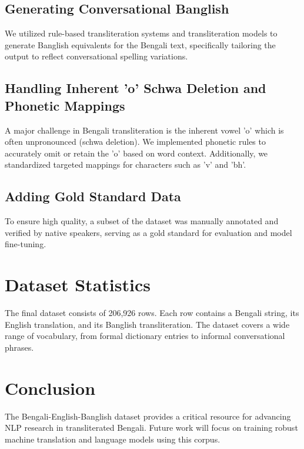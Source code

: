 \documentclass[conference]{IEEEtran}
\begin{document}
\subsection{Generating Conversational Banglish}
We utilized rule-based transliteration systems and transliteration models to generate Banglish equivalents for the Bengali text, specifically tailoring the output to reflect conversational spelling variations.

\subsection{Handling Inherent 'o' Schwa Deletion and Phonetic Mappings}
A major challenge in Bengali transliteration is the inherent vowel 'o' which is often unpronounced (schwa deletion). We implemented phonetic rules to accurately omit or retain the 'o' based on word context. Additionally, we standardized targeted mappings for characters such as 'v' and 'bh'.

\subsection{Adding Gold Standard Data}
To ensure high quality, a subset of the dataset was manually annotated and verified by native speakers, serving as a gold standard for evaluation and model fine-tuning.

\section{Dataset Statistics}
The final dataset consists of 206,926 rows. Each row contains a Bengali string, its English translation, and its Banglish transliteration. The dataset covers a wide range of vocabulary, from formal dictionary entries to informal conversational phrases.

\section{Conclusion}
The Bengali-English-Banglish dataset provides a critical resource for advancing NLP research in transliterated Bengali. Future work will focus on training robust machine translation and language models using this corpus.
\end{document}
